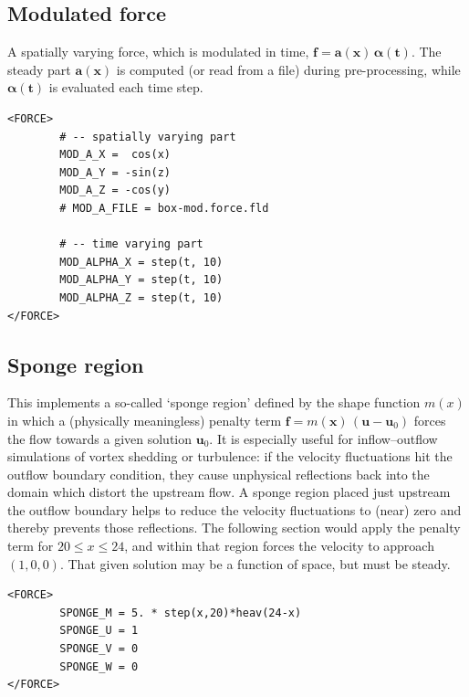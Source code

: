 \documentclass[11pt]{report}
\begin{document}
\subsection{Modulated force}

A spatially varying force, which is modulated in time, $\bm{f} =
\bm{a}(\bm{x}) \, \bm{\alpha(t)} $. The steady part $\bm{a}(\bm{x})$ is
computed (or read from a file) during pre-processing, while
$\bm{\alpha(t)}$ is evaluated each time step.
\begin{verbatim}
<FORCE>
        # -- spatially varying part
        MOD_A_X =  cos(x)
        MOD_A_Y = -sin(z)
        MOD_A_Z = -cos(y)
        # MOD_A_FILE = box-mod.force.fld

        # -- time varying part
        MOD_ALPHA_X = step(t, 10)
        MOD_ALPHA_Y = step(t, 10)
        MOD_ALPHA_Z = step(t, 10)
</FORCE>
\end{verbatim}

\subsection{Sponge region}
\label{sec.sponge}

This implements a so-called `sponge region' defined by the shape
function $m(x)$ in which a (physically meaningless) penalty term
$\bm{f} = m(\bm{x}) \, (\bm{u} - \bm{u}_0)$ forces the flow towards a
given solution $\bm{u}_0$.  It is especially useful for
inflow--outflow simulations of vortex shedding or turbulence: if the
velocity fluctuations hit the outflow boundary condition, they cause
unphysical reflections back into the domain which distort the upstream
flow. A sponge region placed just upstream the outflow boundary helps
to reduce the velocity fluctuations to (near) zero and thereby prevents
those reflections. The following section would apply the penalty term
for $20 \le x \le 24$, and within that region forces the velocity to
approach~$(1, 0, 0).$ That given solution may be a function of space,
but must be steady.
\begin{verbatim}
<FORCE>
        SPONGE_M = 5. * step(x,20)*heav(24-x)
        SPONGE_U = 1
        SPONGE_V = 0
        SPONGE_W = 0
</FORCE>
\end{verbatim}
\end{document}
